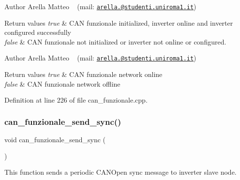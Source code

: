 \begin{DoxyAuthor}{Author}
Arella Matteo ~\newline
 (mail\+: \href{mailto:arella.1646983@studenti.uniroma1.it}{\tt arella.@studenti.\+uniroma1.\+it})
\end{DoxyAuthor}

\begin{DoxyRetVals}{Return values}
{\em true} & C\+AN funzionale initialized, inverter online and inverter configured successfully \\
\hline
{\em false} & C\+AN funzionale not initialized or inverter not online or configured.\\
\hline
\end{DoxyRetVals}
\begin{DoxyAuthor}{Author}
Arella Matteo ~\newline
 (mail\+: \href{mailto:arella.1646983@studenti.uniroma1.it}{\tt arella.@studenti.\+uniroma1.\+it})
\end{DoxyAuthor}

\begin{DoxyRetVals}{Return values}
{\em true} & C\+AN funzionale network online \\
\hline
{\em false} & C\+AN funzionale network offline \\
\hline
\end{DoxyRetVals}


Definition at line 226 of file can\+\_\+funzionale.\+cpp.

\mbox{\label{group___c_a_n__funzionale__group_gac93bbbf1b84f1bc82b26d54d7f898172}} 
\subsubsection{\texorpdfstring{can\+\_\+funzionale\+\_\+send\+\_\+sync()}{can\_funzionale\_send\_sync()}}
{\footnotesize\ttfamily void can\+\_\+funzionale\+\_\+send\+\_\+sync (\begin{DoxyParamCaption}{ }\end{DoxyParamCaption})}



This function sends a periodic C\+A\+N\+Open sync message to inverter slave node. 

